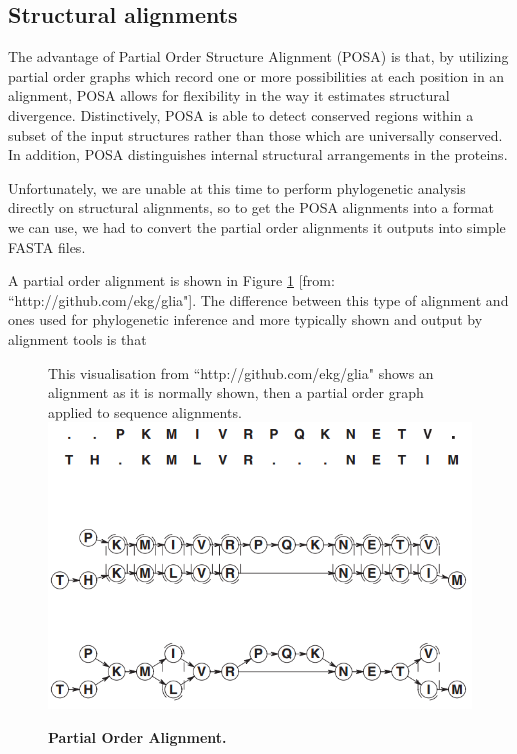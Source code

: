\documentclass[10pt,letterpaper]{article}
\begin{document}
\subsection*{Structural alignments}


The advantage of Partial Order Structure Alignment (POSA) is that, by utilizing partial order graphs which record one or more possibilities at each position in an alignment, POSA allows for flexibility in the way it estimates structural divergence. \cite{POSA} 
Distinctively, POSA is able to detect conserved regions within a subset of the input structures rather than those which are universally conserved.  In addition, POSA distinguishes internal structural arrangements in the proteins. \cite{POSA} 


Unfortunately, we are unable at this time to perform phylogenetic analysis directly on structural alignments, so to get the POSA alignments into a format we can use, we had to convert the partial order alignments it outputs into simple FASTA files.

A partial order alignment is shown in Figure \ref{POA} [from: ``http://github.com/ekg/glia"].  The difference between this type of alignment and ones used for phylogenetic inference and more typically shown and output by alignment tools is that

\begin{figure}
  \caption{\bf Partial Order Alignment.} This visualisation from ``http://github.com/ekg/glia" shows an alignment as it is normally shown, then a partial order graph applied to sequence alignments.
  \centering
    \includegraphics[width=\textwidth]{POA.png}
  \label{POA}  
\end{figure}
\end{document}
